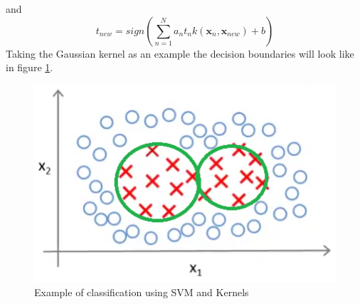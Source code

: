 and
\begin{equation}
t_{new} = sign(\sum^N_{n=1}a_nt_nk(\textbf{x}_n,\textbf{x}_{new}) + b)
\end{equation}
Taking the Gaussian kernel as an example the decision boundaries will look  like in figure \ref{fig:svm-non-linear2}.
\begin{figure}[H]
\centering
\includegraphics[scale=.75]{billeder/svm-non-linear2}
\caption{Example of classification using SVM and Kernels}
\label{fig:svm-non-linear2}
\end{figure}

